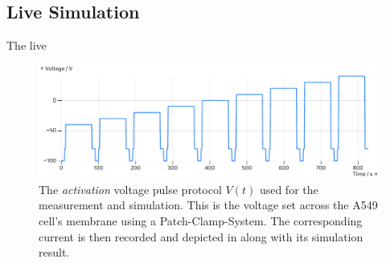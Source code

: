 \documentclass[USenglish,twocolumn]{article}
\begin{document}
  \subsection{Live Simulation}
  The live

  \begin{figure}
    \includegraphics[width=\columnwidth]{../figures/results/voltage-protocol.pdf}
    \caption{The \textit{activation} voltage pulse protocol $V(t)$ used for the measurement and simulation. This is the voltage set across the A549 cell's membrane using a Patch-Clamp-System. The corresponding current is then recorded and depicted in  along with its simulation result.}
    \label{figure:voltage-protocol}
  \end{figure}
\end{document}
